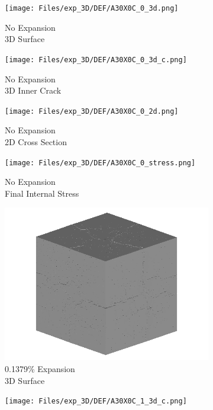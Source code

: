 \begin{figure}[ht!]
\centering
    \begin{subfigure}{.25\textwidth}
      \centering
      \texttt{[image: Files/exp\_3D/DEF/A30X0C\_0\_3d.png]}
      \caption{No Expansion\\3D Surface}
    \end{subfigure}%
    \begin{subfigure}{.25\textwidth}
      \centering
      \texttt{[image: Files/exp\_3D/DEF/A30X0C\_0\_3d\_c.png]}
      \caption{No Expansion\\3D Inner Crack}
    \end{subfigure}%
    \begin{subfigure}{.25\textwidth}
      \centering
      \texttt{[image: Files/exp\_3D/DEF/A30X0C\_0\_2d.png]}
      \caption{No Expansion\\2D Cross Section}
    \end{subfigure}%
    \begin{subfigure}{.25\textwidth}
      \centering
      \texttt{[image: Files/exp\_3D/DEF/A30X0C\_0\_stress.png]}
      \caption{No Expansion\\Final Internal Stress}
    \end{subfigure}
    \begin{subfigure}{.25\textwidth}
      \centering
      \includegraphics[width=.8\linewidth]{Files/exp_3D/DEF/A30X0C_1_3d.png}
      \caption{0.1379\% Expansion\\3D Surface}
    \end{subfigure}%
    \begin{subfigure}{.25\textwidth}
      \centering
      \texttt{[image: Files/exp\_3D/DEF/A30X0C\_1\_3d\_c.png]}

\end{subfigure}
\end{figure}
